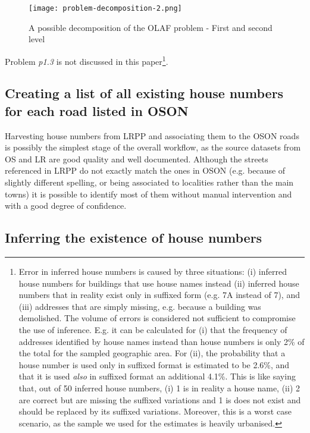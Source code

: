 \begin{figure}
	\texttt{[image: problem-decomposition-2.png]}
	\caption{A possible decomposition of the OLAF problem - First and second level}
	\label{fig:problem_decomposition_2}
\end{figure}

Problem {\it p1.3} is not discussed in this paper\footnote{Error in inferred house numbers is caused by three situations: (i) inferred house numbers for buildings that use house names instead (ii) inferred house numbers that in reality exist only in suffixed form (e.g. 7A instead of 7), and (iii) addresses that are simply missing, e.g. because a building was demolished. The volume of errors is considered not sufficient to compromise the use of inference. E.g. it can be calculated for (i) that the frequency of addresses identified by house names instead than house numbers is only 2\% of the total for the sampled geographic area. For (ii), the probability that a house number is used only in suffixed format is estimated to be 2.6\%, and that it is used {\it also} in suffixed format an additional 4.1\%. This is like saying that, out of 50 inferred house numbers, (i) 1 is in reality a house name, (ii) 2 are correct but are missing the suffixed variations and 1 is does not exist and should be replaced by its suffixed variations. Moreover, this is a worst case scenario, as the sample we used for the estimates is heavily urbanised.}.

\subsection{Creating a list of all existing house numbers for each road listed in OSON} 

Harvesting house numbers from LRPP and associating them to the OSON roads is possibly the simplest stage of the overall workflow, as the source datasets from OS and LR are good quality and well documented. Although the streets referenced in LRPP do not exactly match the ones in OSON (e.g. because of slightly different spelling, or being associated to localities rather than the main towns) it is possible to identify most of them without manual intervention and with a good degree of confidence.

\subsection{Inferring the existence of house numbers} 
\label{inference-algorithms} 

